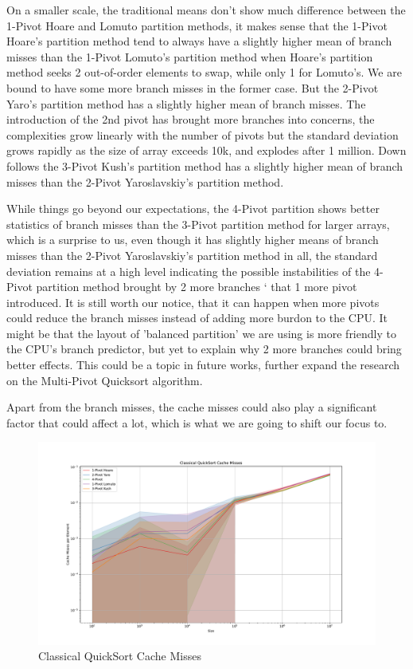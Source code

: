 \documentclass{article}
\begin{document}
On a smaller scale, the traditional means don't show much difference between the 1-Pivot Hoare and Lomuto partition methods,
it makes sense that the 1-Pivot Hoare's partition method tend to always have a slightly higher mean of branch misses than the 1-Pivot Lomuto's partition method
when Hoare's partition method seeks 2 out-of-order elements to swap, while only 1 for Lomuto's. We are bound to have some more branch misses in the former case.
But the 2-Pivot Yaro's partition method has a slightly higher mean of branch misses. The introduction of the 2nd pivot has brought more branches into concerns,
the complexities grow linearly with the number of pivots but the standard deviation grows rapidly as the size of array exceeds 10k, and explodes after 1 million.
Down follows the 3-Pivot Kush's partition method has a slightly higher mean of branch misses than the 2-Pivot Yaroslavskiy's partition method.

While things go beyond our expectations, the 4-Pivot partition shows better statistics of branch misses than the 3-Pivot partition method for larger arrays, which is a surprise to us,
even though it has slightly higher means of branch misses than the 2-Pivot Yaroslavskiy's partition method in all, the standard deviation remains at a high level indicating
the possible instabilities of the 4-Pivot partition method brought by 2 more branches \hypertarget{2MoreBranches}{`} that 1 more pivot introduced. It is still worth our notice, that it can happen when more pivots could reduce the branch misses instead of adding more burdon to the CPU.
It might be that the layout of 'balanced partition' we are using is more friendly to the CPU's branch predictor, but yet to explain why 2 more branches could bring better effects. This could be a topic in future works, further expand the research on the Multi-Pivot Quicksort algorithm. 

Apart from the branch misses, the cache misses could also play a significant factor that could affect a lot, which is what we are going to shift our focus to.

\begin{figure}[H]
    \hypertarget{fig:classicalcachemiss}{}
    \caption{Classical QuickSort Cache Misses}
    \centering
    \hspace*{-0.27\textwidth}
    \includegraphics[width=1.5\textwidth]{Classical QuickSort Cache Misses.pdf}
\end{figure}
\end{document}
